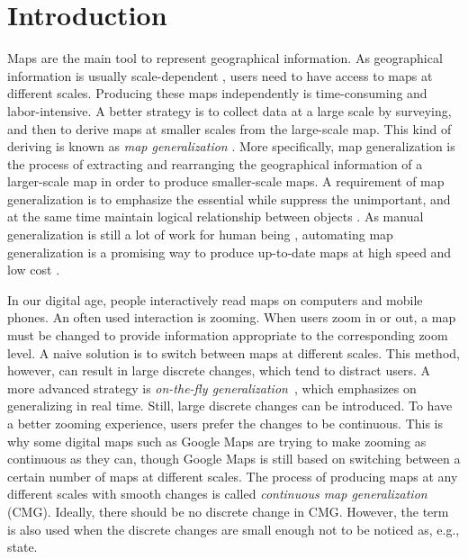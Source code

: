 \chapter{Introduction}
\label{chap:introduction}


Maps are the main tool to represent geographical information. 
As geographical information is usually scale-dependent
\parencite{Muller1995Generalization,Weibel1997}, 
users need to have access to maps at different scales.
Producing these maps independently is
time-consuming and labor-intensive.
A better strategy is 
to collect data at a large scale by surveying, 
and then to derive maps 
at smaller scales from the large-scale map.
This kind of deriving is known as \emph{map generalization}
\parencite{Li2007}.
More specifically, map generalization is 
the process of extracting and rearranging 
the geographical information of a larger-scale map 
in order to produce smaller-scale maps.
A requirement of map generalization is to emphasize the 
essential while suppress the unimportant,
and at the same time maintain logical relationship between 
objects \parencite{Weibel1997}.
As manual generalization is still a lot of work for human being
\parencite{Duchene2014},
automating map generalization is a promising way 
to produce up-to-date maps at high speed and low cost 
\parencite{Mackaness2017Generalization}.


In our digital age, people interactively read maps 
on computers and mobile phones.
An often used interaction is zooming. 
When users zoom in or out, 
a map must be changed to provide information 
appropriate to the corresponding zoom level.
A naive solution is 
to switch between maps at different scales.
This method, however, can result in 
large discrete changes, 
which tend to distract users.
A more advanced strategy is  
\emph{on-the-fly generalization}~\parencite{Weibel2017Fly},
which emphasizes on generalizing in real time.
Still, large discrete changes can be introduced.
To have a better zooming experience, 
users prefer the changes to be continuous.
This is why some digital maps such as Google Maps 
are trying to make zooming as continuous as they can,
though Google Maps is still based on switching between 
a certain number of maps at different scales.
The process of producing maps at any different scales
with smooth changes 
is called \emph{continuous map generalization} (CMG).
Ideally, there should be no discrete change in CMG.
However, the term is also used when 
the discrete changes are small enough not to be noticed as,
e.g., \textcite{Suba2016Road} state.



